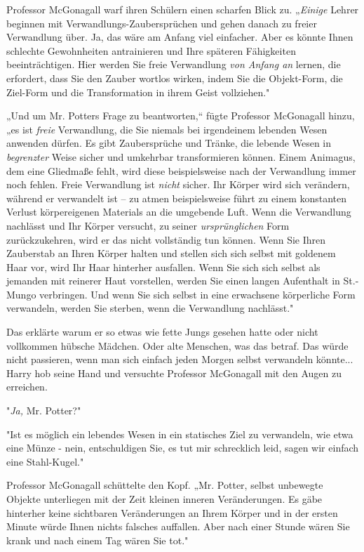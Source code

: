 {Professor McGonagall warf ihren Schülern einen scharfen Blick zu. „\emph{Einige} Lehrer beginnen mit Verwandlungs-Zaubersprüchen und gehen danach zu freier Verwandlung über. Ja, das wäre am Anfang viel einfacher. Aber es könnte Ihnen schlechte Gewohnheiten antrainieren und Ihre späteren Fähigkeiten beeinträchtigen. Hier werden Sie freie Verwandlung \emph{von Anfang an} lernen, die erfordert, dass Sie den Zauber wortlos wirken, indem Sie die Objekt-Form, die Ziel-Form und die Transformation in ihrem Geist vollziehen."

„Und um Mr. Potters Frage zu beantworten,“ fügte Professor McGonagall hinzu, „es ist \emph{freie} Verwandlung, die Sie niemals bei irgendeinem lebenden Wesen anwenden dürfen. Es gibt Zaubersprüche und Tränke, die lebende Wesen in \emph{begrenzter} Weise sicher und umkehrbar transformieren können. Einem Animagus, dem eine Gliedmaße fehlt, wird diese beispielsweise nach der Verwandlung immer noch fehlen. Freie Verwandlung ist \emph{nicht} sicher. Ihr Körper wird sich verändern, während er verwandelt ist -- zu atmen beispielsweise führt zu einem konstanten Verlust körpereigenen Materials an die umgebende Luft. Wenn die Verwandlung nachlässt und Ihr Körper versucht, zu seiner \emph{ursprünglichen} Form zurückzukehren, wird er das nicht vollständig tun können. Wenn Sie Ihren Zauberstab an Ihren Körper halten und stellen sich sich selbst mit goldenem Haar vor, wird Ihr Haar hinterher ausfallen. Wenn Sie sich sich selbst als jemanden mit reinerer Haut vorstellen, werden Sie einen langen Aufenthalt in St.-Mungo verbringen. Und wenn Sie sich selbst in eine erwachsene körperliche Form verwandeln, werden Sie sterben, wenn die Verwandlung nachlässt."

Das erklärte warum er so etwas wie fette Jungs gesehen hatte oder nicht vollkommen hübsche Mädchen. Oder alte Menschen, was das betraf. Das würde nicht passieren, wenn man sich einfach jeden Morgen selbst verwandeln könnte... Harry hob seine Hand und versuchte Professor McGonagall mit den Augen zu erreichen.

"\emph{Ja,} Mr. Potter?"

"Ist es möglich ein lebendes Wesen in ein statisches Ziel zu verwandeln, wie etwa eine Münze - nein, entschuldigen Sie, es tut mir schrecklich leid, sagen wir einfach eine Stahl-Kugel."

Professor McGonagall schüttelte den Kopf. „Mr. Potter, selbst unbewegte Objekte unterliegen mit der Zeit kleinen inneren Veränderungen. Es gäbe hinterher keine sichtbaren Veränderungen an Ihrem Körper und in der ersten Minute würde Ihnen nichts falsches auffallen. Aber nach einer Stunde wären Sie krank und nach einem Tag wären Sie tot."

}
